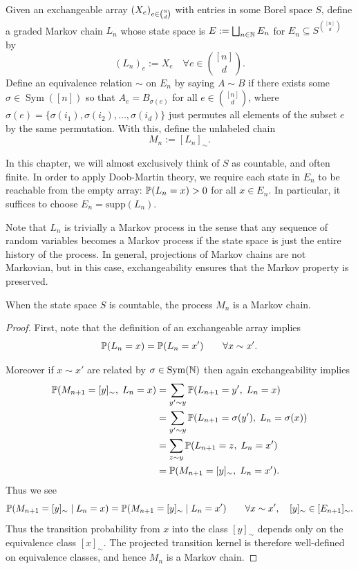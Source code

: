 \begin{definition}\label{def:exchangeable_array_process}
Given an exchangeable array $(X_e)_{e \in \binom{\N}{d}}$ with entries in some Borel
space $S$, define a graded Markov chain $L_n$ whose state space is
$E := \bigsqcup_{n \in \N} E_n$ for $E_n \subseteq S^{\binom{[n]}{d}}$ by
%
    \[(L_n)_e := X_e\quad \forall e \in \binom{[n]}{d}.\]
%
\noindent Define an equivalence relation $\sim$ on $E_n$ by saying
$A \sim B$ if there exists some $\sigma \in \operatorname{Sym}([n])$ so that $A_e = B_{\sigma(e)}$
for all $e \in \binom{[n]}{d}$, where $\sigma(e) = \{\sigma(i_1),\sigma(i_2),\ldots,\sigma(i_d)\}$
just permutes all elements of the subset $e$ by the same permutation. With this, define
the unlabeled chain
%
\[M_n := [L_n]_\sim.\]
%
\end{definition}
%
\noindent In this chapter, we will almost exclusively think of $S$ as countable,
and often finite. In order to apply Doob-Martin theory, we require each state in $E_n$
to be reachable from the empty array: $\P(L_n = x) > 0$ for all $x \in E_n$. In particular,
it suffices to choose $E_n = \mathrm{supp}(L_n)$.

Note that $L_n$ is trivially a Markov process in the sense
that any sequence of random variables becomes a Markov process if the state
space is just the entire history of the process. In general, projections of
Markov chains are not Markovian, but in this case, exchangeability ensures
that the Markov property is preserved.

\begin{lemma}
\label{lem:index_equivalence}
    When the state space $S$ is countable, the process $M_n$ is a Markov chain.

\end{lemma}
%

\begin{proof}
First, note that the definition of an exchangeable array implies
%
\[\P(L_n = x) = \P(L_n = x') \qquad \forall x \sim x'.\]

\noindent Moreover if $x \sim x'$ are related by $\sigma \in \operatorname{Sym}(\N)$ then again exchangeability implies
%
\begin{align*}
    \P(M_{n+1} = [y]_\sim,\; L_n = x) & = \sum_{y' \sim y} \P(L_{n+1} = y', \; L_n = x)\\
    & = \sum_{y' \sim y} \P(L_{n+1} = \sigma(y'), \; L_n = \sigma(x)) \\
    & = \sum_{z \sim y} \P(L_{n+1} = z, \; L_n = x') \\
    & = \P(M_{n+1} = [y]_\sim,\; L_n = x').
\end{align*}
%
\noindent Thus we see
%
\[\P(M_{n+1} = [y]_\sim \; | \; L_n = x) = \P(M_{n+1} = [y]_\sim \; | \; L_n = x') \qquad \forall x \sim x', \quad [y]_\sim \in [E_{n+1}]_\sim.\]
%
\noindent Thus the transition probability from $x$ into the class $[y]_\sim$
depends only on the equivalence class $[x]_\sim$. The projected transition
kernel is therefore well-defined on equivalence classes, and hence $M_n$ is a
Markov chain.
\end{proof}

